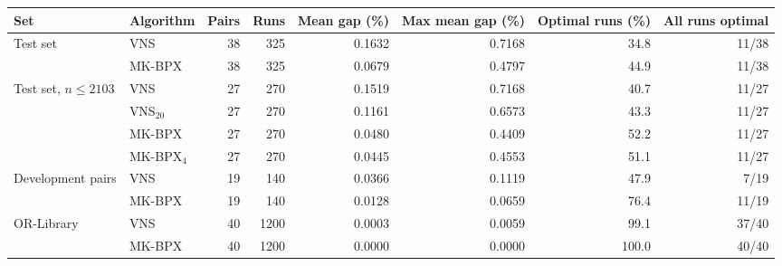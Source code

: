 \begin{tabular}{llrrrrrr}
\toprule
Set & Algorithm & Pairs & Runs & Mean gap (\%) & Max mean gap (\%) & Optimal runs (\%) & All runs optimal \\
\midrule
Test set & VNS & 38 & 325 & 0.1632 & 0.7168 & 34.8 & 11/38 \\
 & MK-BPX & 38 & 325 & 0.0679 & 0.4797 & 44.9 & 11/38 \\
\midrule
Test set, $n\leq 2103$ & VNS & 27 & 270 & 0.1519 & 0.7168 & 40.7 & 11/27 \\
 & VNS$_{20}$ & 27 & 270 & 0.1161 & 0.6573 & 43.3 & 11/27 \\
 & MK-BPX & 27 & 270 & 0.0480 & 0.4409 & 52.2 & 11/27 \\
 & MK-BPX$_{4}$ & 27 & 270 & 0.0445 & 0.4553 & 51.1 & 11/27 \\
\midrule
Development pairs & VNS & 19 & 140 & 0.0366 & 0.1119 & 47.9 & 7/19 \\
 & MK-BPX & 19 & 140 & 0.0128 & 0.0659 & 76.4 & 11/19 \\
\midrule
OR-Library & VNS & 40 & 1200 & 0.0003 & 0.0059 & 99.1 & 37/40 \\
 & MK-BPX & 40 & 1200 & 0.0000 & 0.0000 & 100.0 & 40/40 \\
\bottomrule
\end{tabular}